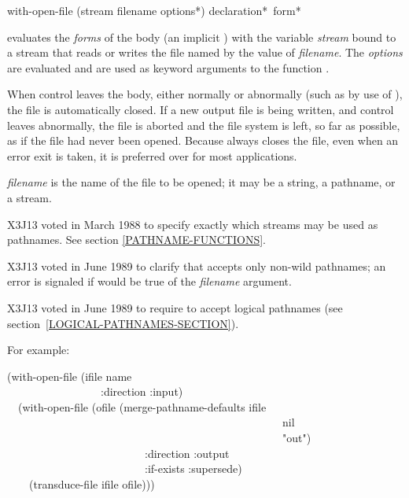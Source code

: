\begin{defmac}
with-open-file (stream filename {options}*)
               {declaration}* {\,form}*

evaluates the \emph{forms} of the body (an implicit ) with the variable
\emph{stream} bound to a stream that reads or writes the file named by the
value of \emph{filename}.
The \emph{options} are evaluated and are used as keyword arguments to
the function .

When control leaves the body, either normally or abnormally (such as by
use of ), the file is automatically closed.  If a new
output file is being written, and control leaves abnormally, the file is
aborted and the file system is left, so far as possible, as if the file
had never been opened.  Because  always closes the
file, even when an error exit is taken, it is preferred over  for
most applications.

\emph{filename} is the name of the file to be opened; it may be a string,
a pathname, or a stream.

\begin{new}
X3J13 voted in March 1988
to specify exactly which streams may be used as pathnames.
See section \ref{PATHNAME-FUNCTIONS}.
\end{new}

\begin{newer}
X3J13 voted in June 1989 
to clarify that  accepts only non-wild pathnames;
an error is signaled if  would be true of
the \emph{filename} argument.
\end{newer}

\begin{newer}
X3J13 voted in June 1989  to require 
to accept logical pathnames (see section~\ref{LOGICAL-PATHNAMES-SECTION}).
\end{newer}


For example:
\begin{lisp}
(with-open-file (ifile name \\
~~~~~~~~~~~~~~~~~:direction :input) \\
~~(with-open-file (ofile (merge-pathname-defaults ifile \\
~~~~~~~~~~~~~~~~~~~~~~~~~~~~~~~~~~~~~~~~~~~~~~~~~~nil \\
~~~~~~~~~~~~~~~~~~~~~~~~~~~~~~~~~~~~~~~~~~~~~~~~~~"out") \\
~~~~~~~~~~~~~~~~~~~~~~~~~:direction :output \\
~~~~~~~~~~~~~~~~~~~~~~~~~:if-exists :supersede) \\
~~~~(transduce-file ifile ofile)))
\end{lisp}


\end{defmac}
